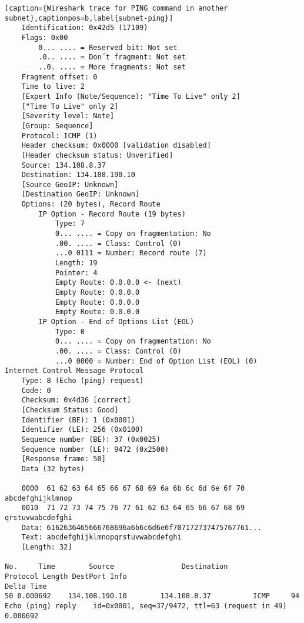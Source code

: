 \begin{lstlisting}[caption={Wireshark trace for PING command in another subnet},captionpos=b,label{subnet-ping}]
	Identification: 0x42d5 (17109)
	Flags: 0x00
		0... .... = Reserved bit: Not set
		.0.. .... = Don´t fragment: Not set
		..0. .... = More fragments: Not set
	Fragment offset: 0
	Time to live: 2
	[Expert Info (Note/Sequence): "Time To Live" only 2]
	["Time To Live" only 2]
	[Severity level: Note]
	[Group: Sequence]
	Protocol: ICMP (1)
	Header checksum: 0x0000 [validation disabled]
	[Header checksum status: Unverified]
	Source: 134.108.8.37
	Destination: 134.108.190.10
	[Source GeoIP: Unknown]
	[Destination GeoIP: Unknown]
	Options: (20 bytes), Record Route
		IP Option - Record Route (19 bytes)
			Type: 7
			0... .... = Copy on fragmentation: No
			.00. .... = Class: Control (0)
			...0 0111 = Number: Record route (7)
			Length: 19
			Pointer: 4
			Empty Route: 0.0.0.0 <- (next)
			Empty Route: 0.0.0.0
			Empty Route: 0.0.0.0
			Empty Route: 0.0.0.0
		IP Option - End of Options List (EOL)
			Type: 0
			0... .... = Copy on fragmentation: No
			.00. .... = Class: Control (0)
			...0 0000 = Number: End of Option List (EOL) (0)
Internet Control Message Protocol
	Type: 8 (Echo (ping) request)
	Code: 0
	Checksum: 0x4d36 [correct]
	[Checksum Status: Good]
	Identifier (BE): 1 (0x0001)
	Identifier (LE): 256 (0x0100)
	Sequence number (BE): 37 (0x0025)
	Sequence number (LE): 9472 (0x2500)
	[Response frame: 50]
	Data (32 bytes)

	0000  61 62 63 64 65 66 67 68 69 6a 6b 6c 6d 6e 6f 70   abcdefghijklmnop
	0010  71 72 73 74 75 76 77 61 62 63 64 65 66 67 68 69   qrstuvwabcdefghi
	Data: 6162636465666768696a6b6c6d6e6f707172737475767761...
	Text: abcdefghijklmnopqrstuvwabcdefghi
	[Length: 32]

No.     Time        Source                Destination           Protocol Length DestPort Info                                                            Delta Time
50 0.000692    134.108.190.10        134.108.8.37          ICMP     94              Echo (ping) reply    id=0x0001, seq=37/9472, ttl=63 (request in 49) 0.000692


\end{lstlisting}
